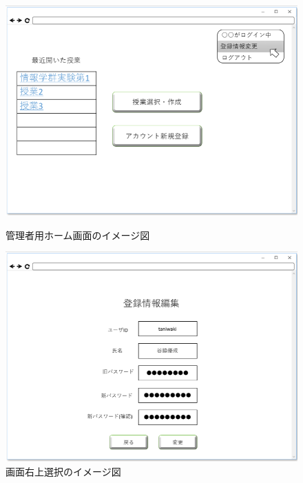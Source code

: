 \begin{figure}[htbp]
 \begin{minipage}{0.5\hsize}
  \begin{center}
   \includegraphics[width=1\linewidth,clip]{./img/05.png}
  \end{center}
  \caption{管理者用ホーム画面のイメージ図}\label{fig:05}
 \end{minipage}
 \begin{minipage}{0.5\hsize}
  \begin{center}
   \includegraphics[width=1\linewidth,clip]{./img/06.png}
  \end{center}
  \caption{画面右上選択のイメージ図　　　}\label{fig:06}
 \end{minipage}
\end{figure}

